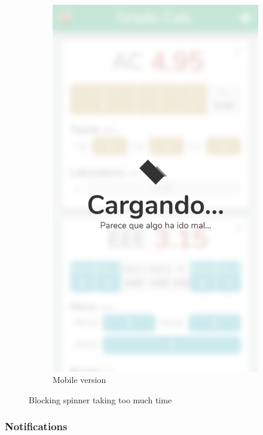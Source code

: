 \begin{figure}[ht!]
\begin{subfigure}[b]{0.243\textwidth-0.1cm}
        \includegraphics[frame,width=\textwidth]{media/screenshots/screenshot-froozen-long.png}
        \caption{Mobile version}
    \end{subfigure}
    \caption{Blocking spinner taking too much time}
    \label{fig:lading-long}
\end{figure}
\vfill

\clearpage\newpage
\subsubsection{Notifications}

